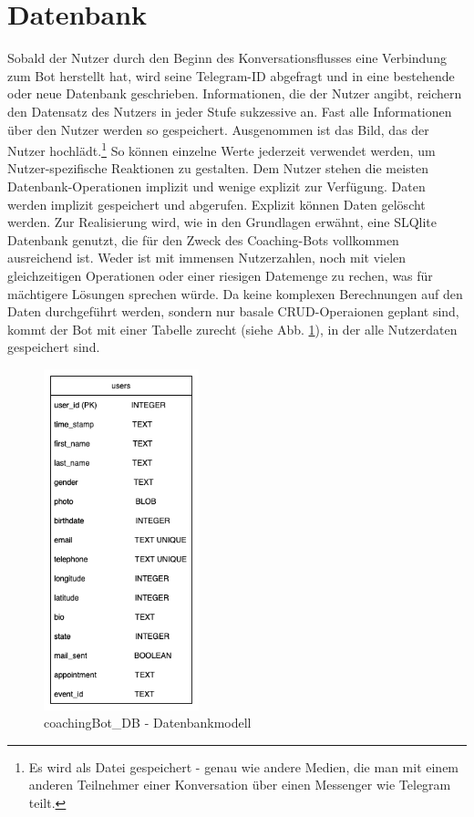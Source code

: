     
    \section{Datenbank} \label{Realisierung: Datenbank}
        Sobald der Nutzer durch den Beginn des Konversationsflusses eine Verbindung zum Bot herstellt hat, wird seine Telegram-ID abgefragt und in eine bestehende oder neue Datenbank geschrieben. Informationen, die der Nutzer angibt, reichern den Datensatz des Nutzers in jeder Stufe sukzessive an. Fast alle Informationen über den Nutzer werden so gespeichert. Ausgenommen ist das Bild, das der Nutzer hochlädt.\footnote{Es wird als Datei gespeichert - genau wie andere Medien, die man mit einem anderen Teilnehmer einer Konversation über einen Messenger wie Telegram teilt.} So können einzelne Werte jederzeit verwendet werden, um Nutzer-spezifische Reaktionen zu gestalten. Dem Nutzer stehen die meisten Datenbank-Operationen implizit und wenige explizit zur Verfügung. Daten werden implizit gespeichert und abgerufen. Explizit können Daten gelöscht werden. Zur Realisierung wird, wie in den Grundlagen erwähnt, eine SLQlite Datenbank genutzt, die für den Zweck des Coaching-Bots vollkommen ausreichend ist. Weder ist mit immensen Nutzerzahlen, noch mit vielen gleichzeitigen Operationen oder einer riesigen Datemenge zu rechen, was für mächtigere Lösungen sprechen würde. Da keine komplexen Berechnungen auf den Daten durchgeführt werden, sondern nur basale CRUD-Operaionen geplant sind, kommt der Bot mit einer Tabelle zurecht (siehe Abb. \ref{fig: data base model}), in der alle Nutzerdaten gespeichert sind.
        \begin{figure} %
            \centering
            \includegraphics[width=0.4\textwidth]{images/220325_PA28464_DataBaseModel.png}
            \caption{coachingBot\_DB - Datenbankmodell}
            \label{fig: data base model}
        \end{figure}


